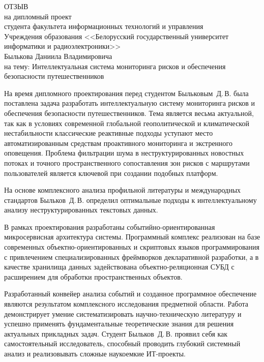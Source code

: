 \thispagestyle{empty}

\begin{singlespace}

{\small
  \begin{center}
    \begin{minipage}{0.8\textwidth}
      \begin{center}
        {\normalsize ОТЗЫВ}\\[1em]
        на дипломный проект\\студента факультета информационных технологий 
        и управления\\Учреждения образования <<Белорусский государственный университет информатики и радиоэлектроники>>\\
        Былькова Даниила Владимировича\\
        на тему: Интеллектуальная система мониторинга рисков и обеспечения безопасности путешественников
      \end{center}
    \end{minipage}
  \end{center}

На время дипломного проектирования перед студентом Быльковым~Д.\,В. была поставлена задача разработать интеллектуальную систему мониторинга рисков и обеспечения безопасности путешественников.
Тема является весьма актуальной, так как в условиях современной глобальной геополитической и климатической нестабильности классические реактивные подходы уступают место автоматизированным средствам проактивного мониторинга и экстренного оповещения.
Проблема фильтрации шума в неструктурированных новостных потоках и точного пространственного сопоставления зон рисков с маршрутами пользователей является ключевой при создании подобных платформ.

На основе комплексного анализа профильной литературы и международных стандартов Быльков~Д.\,В. определил оптимальные подходы к интеллектуальному анализу неструктурированных текстовых данных.

В рамках проектирования разработаны событийно-ориентированная микросервисная архитектура системы. Программный комплекс реализован на базе современных объектно-ориентированных и скриптовых языков программирования с привлечением специализированных фреймворков декларативной разработки, а в качестве хранилища данных задействована объектно-реляционная СУБД с расширением для обработки пространственных объектов.

Разработанный конвейер анализа событий и созданное программное обеспечение являются результатом комплексного исследования предметной области. Работа демонстрирует умение систематизировать научно-техническую литературу и успешно применять фундаментальные теоретические знания для решения актуальных прикладных задач. Студент Быльков~Д.\,В. проявил себя как самостоятельный исследователь, способный проводить глубокий системный анализ и реализовывать сложные наукоемкие ИТ-проекты.

}
\end{singlespace}
